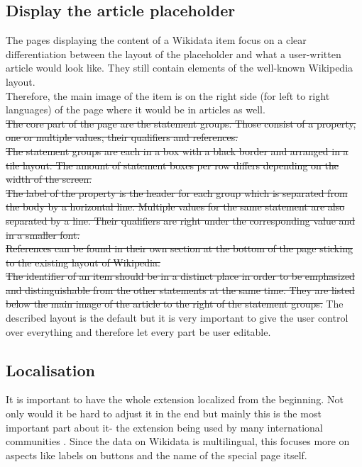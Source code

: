 \subsection{Display the article placeholder}
The pages displaying the content of a Wikidata item focus on a clear differentiation between the layout of the placeholder and what a user-written article would look like. They still contain elements of the well-known Wikipedia layout. \\
Therefore, the main image of the item is on the right side (for left to right languages) of the page where it would be in articles as well.\\
\st{The core part of the page are the statement groups. Those consist of a property, one or multiple values, their qualifiers and references. \\
The statement groups are each in a box with a black border and arranged in a tile layout. The amount of statement boxes per row differs depending on the width of the screen. \\
The label of the property is the header for each group which is separated from the body by a horizontal line. Multiple values for the same statement are also separated by a line. Their qualifiers are right under the corresponding value and in a smaller font. \\
References can be found in their own section at the bottom of the page sticking to the existing layout of Wikipedia. \\
The identifier of an item should be in a distinct place in order to be emphasized and distinguishable from the other statements at the same time. They are listed below the main image of the article to the right of the statement groups.}
The described layout is the default but it is very important to give the user control over everything and therefore let every part be user editable. \\

\subsection{Localisation}
It is important to have the whole extension localized from the beginning. Not only would it be hard to adjust it in the end but mainly this is the most important part about it- the extension being used by many international communities%
. Since the data on Wikidata is multilingual, this focuses more on aspects like labels on buttons and the name of the special page itself. \\

